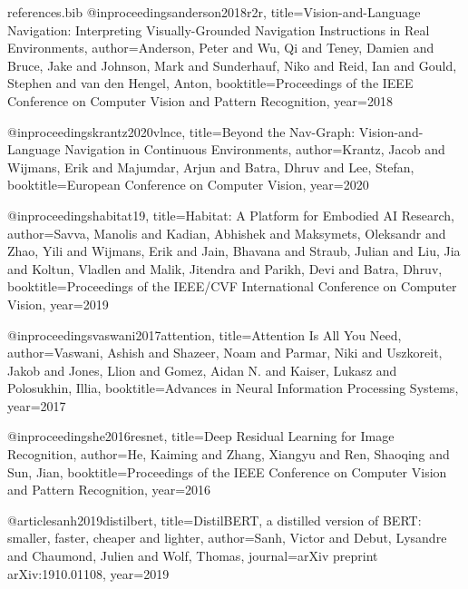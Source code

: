 \begin{filecontents*}{references.bib}
@inproceedings{anderson2018r2r,
  title={Vision-and-Language Navigation: Interpreting Visually-Grounded Navigation Instructions in Real Environments},
  author={Anderson, Peter and Wu, Qi and Teney, Damien and Bruce, Jake and Johnson, Mark and Sunderhauf, Niko and Reid, Ian and Gould, Stephen and van den Hengel, Anton},
  booktitle={Proceedings of the IEEE Conference on Computer Vision and Pattern Recognition},
  year={2018}
}

@inproceedings{krantz2020vlnce,
  title={Beyond the Nav-Graph: Vision-and-Language Navigation in Continuous Environments},
  author={Krantz, Jacob and Wijmans, Erik and Majumdar, Arjun and Batra, Dhruv and Lee, Stefan},
  booktitle={European Conference on Computer Vision},
  year={2020}
}

@inproceedings{habitat19,
  title={Habitat: A Platform for Embodied AI Research},
  author={Savva, Manolis and Kadian, Abhishek and Maksymets, Oleksandr and Zhao, Yili and Wijmans, Erik and Jain, Bhavana and Straub, Julian and Liu, Jia and Koltun, Vladlen and Malik, Jitendra and Parikh, Devi and Batra, Dhruv},
  booktitle={Proceedings of the IEEE/CVF International Conference on Computer Vision},
  year={2019}
}

@inproceedings{vaswani2017attention,
  title={Attention Is All You Need},
  author={Vaswani, Ashish and Shazeer, Noam and Parmar, Niki and Uszkoreit, Jakob and Jones, Llion and Gomez, Aidan N. and Kaiser, Lukasz and Polosukhin, Illia},
  booktitle={Advances in Neural Information Processing Systems},
  year={2017}
}

@inproceedings{he2016resnet,
  title={Deep Residual Learning for Image Recognition},
  author={He, Kaiming and Zhang, Xiangyu and Ren, Shaoqing and Sun, Jian},
  booktitle={Proceedings of the IEEE Conference on Computer Vision and Pattern Recognition},
  year={2016}
}

@article{sanh2019distilbert,
  title={DistilBERT, a distilled version of BERT: smaller, faster, cheaper and lighter},
  author={Sanh, Victor and Debut, Lysandre and Chaumond, Julien and Wolf, Thomas},
  journal={arXiv preprint arXiv:1910.01108},
  year={2019}
}
\end{filecontents*}

\documentclass[sigconf,nonacm]{acmart}

\renewcommand\footnotetextcopyrightpermission[1]{}
\pagestyle{plain}

\usepackage{booktabs}
\usepackage{multirow}
\usepackage{amsmath}
\usepackage{graphicx}
\usepackage{subcaption}
\usepackage{xcolor}
\usepackage{enumitem}
\usepackage{microtype}

